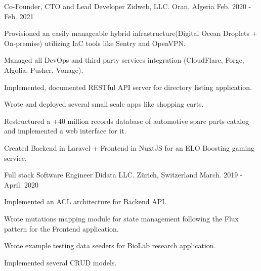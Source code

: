 \begin{cventries}
  \cventry
    {Co-Founder, CTO and Lead Developer} %
    {Zidweb, LLC.} %
    {Oran, Algeria} %
    {Feb. 2020 - Feb. 2021} %
    {
      \begin{cvitems} %
        \item {Provisioned an easily manageable hybrid infrastructure(Digital Ocean Droplets + On-premise) utilizing IaC tools like Sentry and OpenVPN.}
        \item {Managed all DevOps and third party services integration (CloudFlare, Forge, Algolia, Pusher, Vonage).}
        \item {Implemented, documented RESTful API server for directory listing application.}
        \item {Wrote and deployed several small scale apps like shopping carts.}
        \item {Restructured a +40 million records database of automotive spare parts catalog and implemented a web interface for it.}
        \item {Created Backend in Laravel + Frontend in NuxtJS for an ELO Boosting gaming service.}
      \end{cvitems}
    }

  \cventry
    {Full stack Software Engineer} %
    {Didata LLC.} %
    {Zürich, Switzerland} %
    {March. 2019 - April. 2020} %
    {
      \begin{cvitems} %
        \item {Implemented an ACL architecture for Backend API.}
        \item {Wrote mutations mapping module for state management following the Flux pattern for the Frontend application.}
        \item {Wrote example testing data seeders for BioLab research application.}
        \item {Implemented several CRUD models.}
      \end{cvitems}
    }

\end{cventries}
